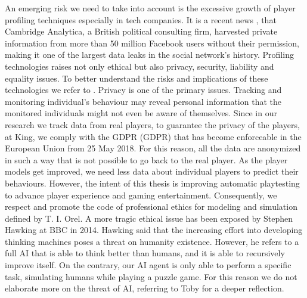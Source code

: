 An emerging risk we need to take into account is the excessive growth of player profiling techniques especially in tech companies. It is a recent news \cite{rosenberg_how_2018}, that Cambridge Analytica, a British political consulting firm, harvested private information from more than 50 million Facebook users without their permission, making it one of the largest data leaks in the social network’s history.
Profiling technologies raises not only ethical but also privacy, security, liability and equality issues. To better understand the risks and implications of these technologies we refer to \cite{solove_digital_2006, hildebrandt_profiling_2008}.
Privacy is one of the primary issues. Tracking and monitoring individual's behaviour may reveal personal information that the monitored individuals might not even be aware of themselves. Since in our research we track data from real players, to guarantee the privacy of the players, at King, we comply with the \acl{GDPR} (GDPR) \cite{european_union_general_2017} that has become enforceable in the European Union from 25 May 2018. For this reason, all the data are anonymized in such a way that is not possible to go back to the real player.
As the player models get improved, we need less data about individual players to predict their behaviours. However, the intent of this thesis is improving automatic playtesting to advance player experience and gaming entertainment. Consequently, we respect and promote the code of professional ethics for modeling and simulation \cite{oren_ethics_2005} defined by T. I. Orel. 
A more tragic ethical issue has been exposed by Stephen Hawking \cite{lee_hawking:_2014} at BBC in 2014. Hawking said that the increasing effort into developing thinking machines poses a threat on humanity existence. However, he refers to a full \acs{AI} that is able to think better than humans, and it is able to recursively improve itself. On the contrary, our \acs{AI} agent is only able to perform a specific task, simulating humans while playing a puzzle game. For this reason we do not elaborate more on the threat of \acs{AI}, referring to Toby \textcite{walsh_what_2016} for a deeper reflection.  


